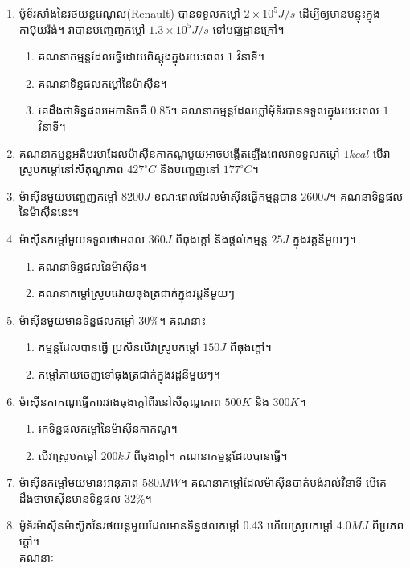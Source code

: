 \begin{enumerate}
\begin{enumerate}
		\end{enumerate}
		\item ម៉ូទ័រសាំងនៃរថយន្តរេណូល{\en(Renault)} បានទទួលកម្តៅ $2\times10^{5}J/s$ ដើម្បីឲ្យមានបន្ទុះក្នុងកាប៊ុយរ៉ង់។ វាបានបញ្ចេញកម្តៅ $1.3\times10^{5}J/s$ ទៅមជ្ឈដ្ឋានក្រៅ។
		\begin{enumerate}
			\item គណនាកម្មន្តដែលធ្វើដោយពិស្តុងក្នុងរយៈពេល $1$ វិនាទី។
			\item គណនាទិន្នផលកម្តៅនៃម៉ាសុីន។
			\item គេដឹងថាទិន្នផលមេកានិចគឺ $0.85$។ គណនាកម្មន្តដែលភ្លៅម៉័ទ័របានទទួលក្នុងរយៈពេល $1$ វិនាទី។
		\end{enumerate}  
		\item គណនាកម្មន្តអតិបរមាដែលម៉ាសុីនកាកណូមួយអាចបង្កើតឡើងពេលវាទទួលកម្តៅ $1kcal$ បើវាស្រូបកម្តៅនៅសីតុណ្ហភាព $427^\circ C$ និងបញ្ខេញនៅ $177^\circ C$។
		\item ម៉ាសុីនមួយបញ្ចេញកម្តៅ $8200J$ ខណៈពេលដែលម៉ាសុីនធ្វើកម្មន្តបាន $2600J$។ គណនាទិន្នផលនៃម៉ាសុីននេះ។
		\item ម៉ាសុីនកម្តៅមួយទទួលថាមពល $360J$ ពីធុងក្តៅ និងផ្តល់កម្មន្ត $25J$ ក្នុងវគ្គនីមួយៗ។
		\begin{enumerate}
			\item គណនាទិន្នផលនៃម៉ាសុីន។
			\item គណនាកម្តៅស្រូបដោយធុងត្រជាក់ក្នុងវដ្តនីមួយៗ
		\end{enumerate}
		\item ម៉ាសុីនមួយមានទិន្នផលកម្តៅ $30\%$។ គណនា៖
		\begin{enumerate}
			\item កម្មន្តដែលបានធ្វើ ប្រសិនបើវាស្រូបកម្តៅ $150J$ ពីធុងក្តៅ។
			\item កម្តៅភាយចេញទៅធុងត្រជាក់ក្នុងវដ្តនីមួយៗ។
		\end{enumerate}
		\item ម៉ាសុីនកាកណូធ្វើការរវាងធុងក្តៅពីរនៅសីតុណ្ហភាព $500K$ និង $300K$។ 
		\begin{enumerate}
			\item រកទិន្នផលកម្តៅនៃម៉ាសុីនកាកណូ។
			\item បើវាស្រូបកម្តៅ $200kJ$ ពីធុងក្តៅ។ គណនាកម្មន្តដែលបានធ្វើ។
		\end{enumerate}
		\item ម៉ាសុីនកម្តៅមយមានអានុភាព $580MW$។ គណនាកម្តៅដែលម៉ាសុីនបាត់បង់រាល់វិនាទី បើគេដឹងថាម់ាសុីនមានទិន្នផល $32\%$។
		\item ម៉ូទ័រម៉ាសុីនម៉ាស៊ូតនៃរថយន្តមួយដែលមានទិន្នផលកម្តៅ $0.43$ ហើយស្រូបកម្តៅ $4.0MJ$ ពីប្រភពក្តៅ។\\គណនាៈ
		\begin{enumerate}

\end{enumerate}
\end{enumerate}
